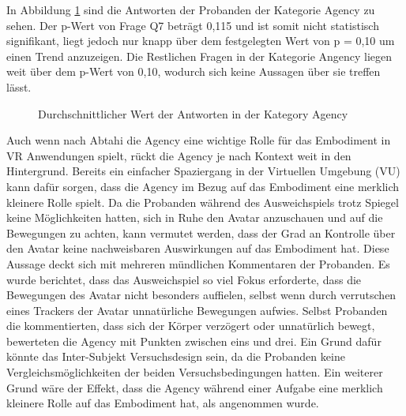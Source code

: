 In Abbildung \ref{fig:AgencyScores} sind die Antworten der Probanden der Kategorie Agency zu sehen. Der p-Wert von Frage Q7 beträgt 0,115 und ist somit nicht statistisch signifikant, liegt jedoch nur knapp über dem festgelegten Wert von p = 0,10 um einen Trend anzuzeigen. Die Restlichen Fragen in der Kategorie Angency liegen weit über dem p-Wert von 0,10, wodurch sich keine Aussagen über sie treffen lässt.

\begin{figure}[h]
  \caption[Durchschnittlicher Wert der Antworten in der Kategory Agency]{Durchschnittlicher Wert der Antworten in der Kategory Agency}
  \label{fig:AgencyScores}
\end{figure}


Auch wenn nach Abtahi \cite{Abtahi2019} die Agency eine wichtige Rolle für das Embodiment in VR Anwendungen spielt, rückt die Agency je nach Kontext weit in den Hintergrund. Bereits ein einfacher Spaziergang in der Virtuellen Umgebung (VU) kann dafür sorgen, dass die Agency im Bezug auf das Embodiment eine merklich kleinere Rolle spielt. Da die Probanden während des Ausweichspiels trotz Spiegel keine Möglichkeiten hatten, sich in Ruhe den Avatar anzuschauen und auf die Bewegungen zu achten, kann vermutet werden, dass der Grad an Kontrolle über den Avatar keine nachweisbaren Auswirkungen auf das Embodiment hat. Diese Aussage deckt sich mit mehreren mündlichen Kommentaren der Probanden. Es wurde berichtet, dass das Ausweichspiel so viel Fokus erforderte, dass die Bewegungen des Avatar nicht besonders auffielen, selbst wenn durch verrutschen eines Trackers der Avatar unnatürliche Bewegungen aufwies.
Selbst Probanden die kommentierten, dass sich der Körper verzögert oder unnatürlich bewegt, bewerteten die Agency mit Punkten zwischen eins und drei. Ein Grund dafür könnte das Inter-Subjekt Versuchsdesign sein, da die Probanden keine Vergleichsmöglichkeiten der beiden Versuchsbedingungen hatten. Ein weiterer Grund wäre der Effekt, dass die Agency während einer Aufgabe eine merklich kleinere Rolle auf das Embodiment hat, als angenommen wurde.


